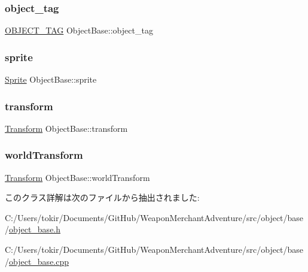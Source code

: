 \subsubsection{\texorpdfstring{object\+\_\+tag}{object\_tag}}
{\footnotesize\ttfamily \mbox{\hyperlink{object__base_8h_a0eff9883ab049ee02773dde19d057c0c}{O\+B\+J\+E\+C\+T\+\_\+\+T\+AG}} Object\+Base\+::object\+\_\+tag}

\mbox{\label{class_object_base_a16415e349623e10f45518fb637f7051b}} 
\subsubsection{\texorpdfstring{sprite}{sprite}}
{\footnotesize\ttfamily \mbox{\hyperlink{class_sprite}{Sprite}} Object\+Base\+::sprite\hspace{0.3cm}{\ttfamily [protected]}}

\mbox{\label{class_object_base_ac8096c26fe09682da6119208d392dc62}} 
\subsubsection{\texorpdfstring{transform}{transform}}
{\footnotesize\ttfamily \mbox{\hyperlink{class_transform}{Transform}} Object\+Base\+::transform}

\mbox{\label{class_object_base_abedc2ea4baa694611f8822ea6e04b210}} 
\subsubsection{\texorpdfstring{world\+Transform}{worldTransform}}
{\footnotesize\ttfamily \mbox{\hyperlink{class_transform}{Transform}} Object\+Base\+::world\+Transform\hspace{0.3cm}{\ttfamily [protected]}}



このクラス詳解は次のファイルから抽出されました\+:\begin{DoxyCompactItemize}
\item 
C\+:/\+Users/tokir/\+Documents/\+Git\+Hub/\+Weapon\+Merchant\+Adventure/src/object/base/\mbox{\hyperlink{object__base_8h}{object\+\_\+base.\+h}}\item 
C\+:/\+Users/tokir/\+Documents/\+Git\+Hub/\+Weapon\+Merchant\+Adventure/src/object/base/\mbox{\hyperlink{object__base_8cpp}{object\+\_\+base.\+cpp}}\end{DoxyCompactItemize}
